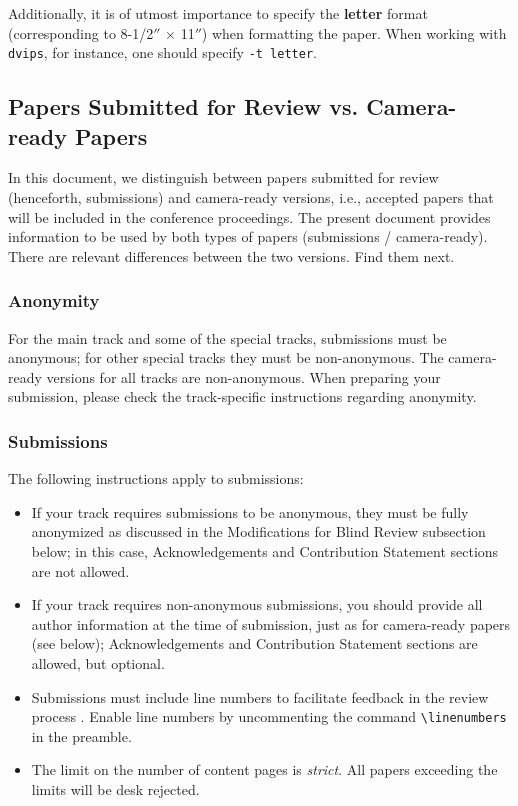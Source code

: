 \documentclass{article}
\begin{document}
Additionally, it is of utmost importance to specify the {\bf
		letter} format (corresponding to 8-1/2$''$ $\times$ 11$''$) when
formatting the paper. When working with {\tt dvips}, for instance, one
should specify {\tt -t letter}.

\subsection{Papers Submitted for Review vs. Camera-ready Papers}
In this document, we distinguish between papers submitted for review (henceforth, submissions) and camera-ready versions, i.e., accepted papers that will be included in the conference proceedings. The present document provides information to be used by both types of papers (submissions / camera-ready). There are relevant differences between the two versions. Find them next.

\subsubsection{Anonymity}
For the main track and some of the special tracks, submissions must be anonymous; for other special tracks they must be non-anonymous. The camera-ready versions for all tracks are non-anonymous. When preparing your submission, please check the track-specific instructions regarding anonymity.

\subsubsection{Submissions}
The following instructions apply to submissions:
\begin{itemize}
	\item If your track requires submissions to be anonymous, they must be fully anonymized as discussed in the Modifications for Blind Review subsection below; in this case, Acknowledgements and Contribution Statement sections are not allowed.

	\item If your track requires non-anonymous submissions, you should provide all author information at the time of submission, just as for camera-ready papers (see below); Acknowledgements and Contribution Statement sections are allowed, but optional.

	\item Submissions must include line numbers to facilitate feedback in the review process . Enable line numbers by uncommenting the command {\tt \textbackslash{}linenumbers} in the preamble.

	\item The limit on the number of  content pages is \emph{strict}. All papers exceeding the limits will be desk rejected.
\end{itemize}
\end{document}
